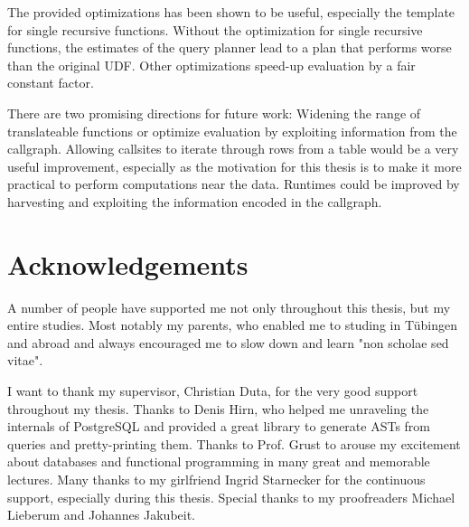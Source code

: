 The provided optimizations has been shown to be useful, especially the template for single recursive functions. Without the optimization for single recursive functions, the estimates of the query planner lead to a plan that performs worse than the original UDF. Other optimizations speed-up evaluation by a fair constant factor.

There are two promising directions for future work: Widening the range of translateable functions or optimize evaluation by exploiting information from the callgraph. Allowing callsites to iterate through rows from a table would be a very useful improvement, especially as the motivation for this thesis is to make it more practical to perform computations near the data. Runtimes could be improved by harvesting and exploiting the information encoded in the callgraph.

\section*{Acknowledgements}
A number of people have supported me not only throughout this thesis, but my entire studies. Most notably my parents, who enabled me to studing in Tübingen and abroad and always encouraged me to slow down and learn "non scholae sed vitae".

I want to thank my supervisor, Christian Duta, for the very good support throughout my thesis. Thanks to Denis Hirn, who helped me unraveling the internals of PostgreSQL and provided a great library to generate ASTs from queries and pretty-printing them. Thanks to Prof. Grust to arouse my excitement about databases and functional programming in many great and memorable lectures. 
Many thanks to my girlfriend Ingrid Starnecker for the continuous support, especially during this thesis. Special thanks to my proofreaders Michael Lieberum and Johannes Jakubeit.